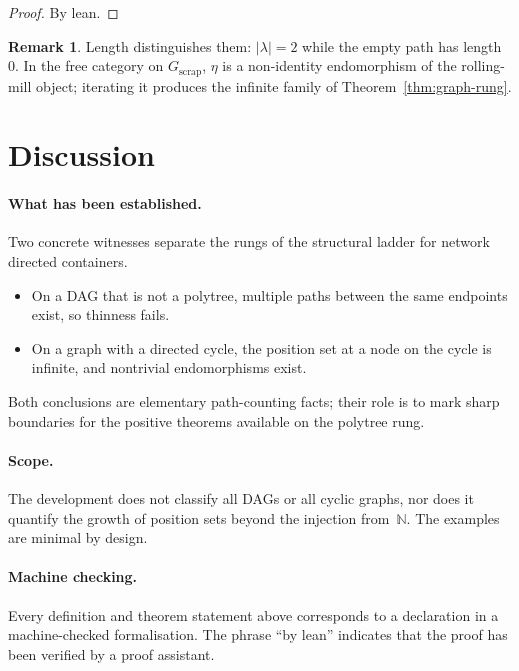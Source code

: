 \documentclass[11pt,a4paper]{article}
\theoremstyle{plain}
\theoremstyle{definition}
\newtheorem{remark}[theorem]{Remark}
\newcommand{\N}{\mathbb{N}}
\begin{document}
\begin{proof}
By lean.
\end{proof}

\begin{remark}
Length distinguishes them: $\lvert\lambda\rvert = 2$ while the empty path has
length~$0$. In the free category on $G_{\mathrm{scrap}}$, $\eta$ is a
non-identity endomorphism of the rolling-mill object; iterating it produces the
infinite family of Theorem~\ref{thm:graph-rung}.
\end{remark}

\section{Discussion}

\paragraph{What has been established.}
Two concrete witnesses separate the rungs of the structural ladder for network
directed containers.
\begin{itemize}
  \item On a DAG that is not a polytree, multiple paths between the same
        endpoints exist, so thinness fails.
  \item On a graph with a directed cycle, the position set at a node on the
        cycle is infinite, and nontrivial endomorphisms exist.
\end{itemize}
Both conclusions are elementary path-counting facts; their role is to mark
sharp boundaries for the positive theorems available on the polytree rung.

\paragraph{Scope.}
The development does not classify all DAGs or all cyclic graphs, nor does it
quantify the growth of position sets beyond the injection from~$\N$. The
examples are minimal by design.

\paragraph{Machine checking.}
Every definition and theorem statement above corresponds to a declaration in a
machine-checked formalisation. The phrase ``by lean'' indicates that the proof
has been verified by a proof assistant.
\end{document}
